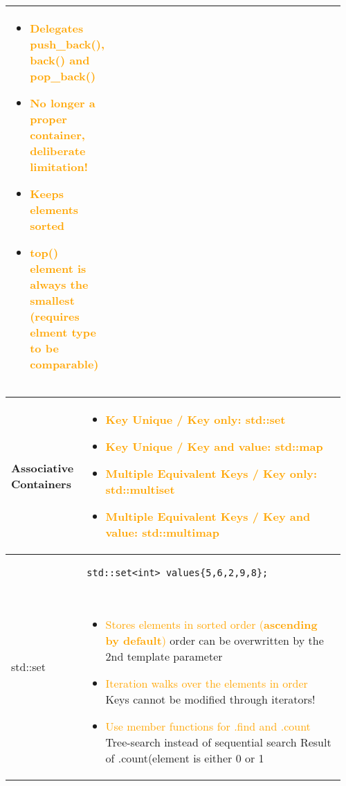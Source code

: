 \documentclass[main.tex,fontsize=8pt,paper=a4,paper=portrait,DIV=calc,]{scrartcl}
\begin{document}
\begin{table}[ht!]
\begin{tabular}{|m{0.2\linewidth}|m{0.755\linewidth}|}
\begin{itemize}
\item \textcolor{orange}{Delegates push\_back(), back() and pop\_back()}
\item \textcolor{orange}{No longer a proper container, \textbf{deliberate limitation!}}
\item \textcolor{orange}{Keeps elements sorted}
\item \textcolor{orange}{top() element is always the smallest (requires elment type to be comparable)}
\vspace{-2mm}
\end{itemize}\\
\hline
\end{tabular}
\end{table}
\pagebreak
\begin{table}[ht!]
\begin{tabular}{|m{0.2\linewidth}|m{0.755\linewidth}|}
\hline
\vspace{2mm}
Associative Containers & 
\begin{itemize}
\item \textcolor{Orange}{Key Unique / Key only: std::set}
\item \textcolor{Orange}{Key Unique / Key and value: std::map}
\item \textcolor{Orange}{Multiple Equivalent Keys / Key only: std::multiset}
\item \textcolor{Orange}{Multiple Equivalent Keys / Key and value: std::multimap}
\vspace{-2mm}
\end{itemize}\\ 
\hline
std::set &
\begin{lstlisting}
std::set<int> values{5,6,2,9,8};
\end{lstlisting}
\, \newline
\begin{itemize}
\item \textcolor{orange}{Stores elements in sorted order (\textbf{ascending by default})}\newline
  order can be overwritten by the 2nd template parameter
\item \textcolor{orange}{Iteration walks over the elements in order}\newline
  Keys cannot be modified through iterators!
\item \textcolor{orange}{Use member functions for .find and .count}\newline
  Tree-search instead of sequential search\newline
  Result of .count(element is either 0 or 1\newline

\end{itemize}
\end{tabular}
\end{table}
\end{document}
